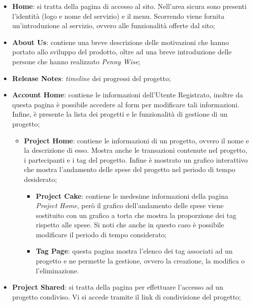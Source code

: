 \begin{itemize}
    \item \textbf{Home}: si tratta della pagina di accesso al sito. Nell'area sicura sono presenti l'identità (logo e nome del servizio) e il menu. Scorrendo viene fornita un'introduzione al servizio, ovvero alle funzionalità offerte dal sito;

    \item \textbf{About Us}: contiene una breve descrizione delle motivazioni
		che hanno portato allo sviluppo del prodotto, oltre ad una breve
		introduzione delle persone che hanno realizzato \textit{Penny Wise};

    \item \textbf{Release Notes}: \textit{timeline} dei progressi del progetto;

    \item \textbf{Account Home}: contiene le informazioni dell'Utente Registrato, inoltre da questa pagina è possibile accedere al form per modificare tali informazioni. Infine, è presente la lista dei progetti e le funzionalità di gestione di un progetto;
    
    \begin{itemize}
        \item \textbf{Project Home}: contiene le informazioni di un progetto, ovvero il nome e la descrizione di esso. Mostra anche le transazioni contenute nel progetto, i partecipanti e i tag del progetto. Infine è mostrato un grafico interattivo che mostra l'andamento delle spese del progetto nel periodo di tempo desiderato;
        
        \begin{itemize}
            \item \textbf{Project Cake}: contiene le medesime informazioni della pagina \textit{Project Home}, però il grafico dell'andamento delle spese viene sostituito con un grafico a torta che mostra la proporzione dei tag rispetto alle spese. Si noti che anche in questo caso è possibile modificare il periodo di tempo considerato;

            \item \textbf{Tag Page}: questa pagina mostra l'elenco dei tag associati ad un progetto e ne permette la gestione, ovvero la creazione, la modifica o l'eliminazione.
        \end{itemize}
    \end{itemize}

    \item \textbf{Project Shared}: si tratta della pagina per effettuare
		l'accesso ad un progetto condiviso. Vi si accede tramite il link di
		condivisione del progetto;
\end{itemize}

